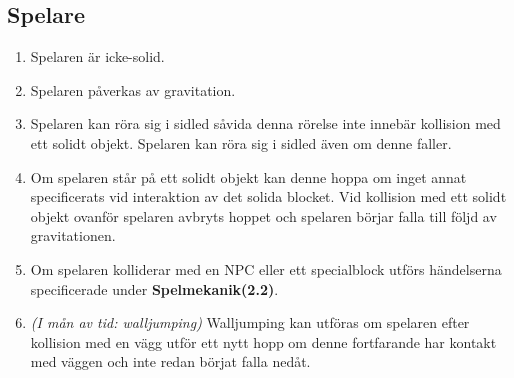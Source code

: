 \documentclass{TDP003mall}
\begin{document}
\subsection{Spelare}
\begin{enumerate}
\item Spelaren är icke-solid.

\item Spelaren påverkas av gravitation.

\item Spelaren kan röra sig i sidled såvida denna rörelse inte innebär kollision med ett solidt objekt. Spelaren kan röra sig i sidled även om denne faller.

\item Om spelaren står på ett solidt objekt kan denne hoppa om inget annat specificerats vid interaktion av det solida blocket. Vid kollision med ett solidt objekt ovanför spelaren avbryts hoppet och spelaren börjar falla till följd av gravitationen.

\item Om spelaren kolliderar med en NPC eller ett specialblock utförs händelserna specificerade under \textbf{Spelmekanik(2.2)}.

\item \noindent\textit{(I mån av tid: walljumping)} Walljumping kan utföras om spelaren efter kollision med en vägg utför ett nytt hopp om denne fortfarande har kontakt med väggen och inte redan börjat falla nedåt.

\newpage


\end{enumerate}
\end{document}
